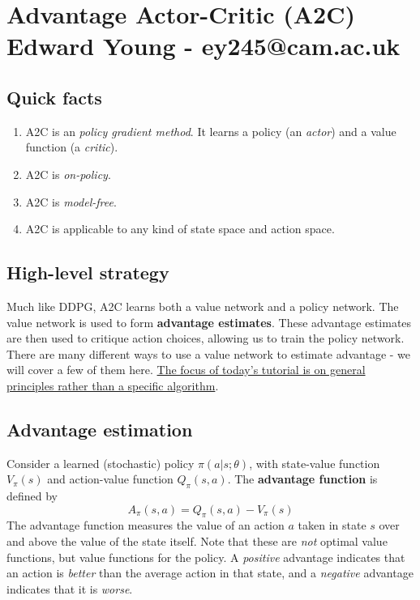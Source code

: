 \documentclass[]{article}
\title{}
\author{Edward Young \\ \large ey245@cam.ac.uk}
\date{}
\begin{document}
\section*{Advantage Actor-Critic (A2C) \\ \small Edward Young - ey245@cam.ac.uk}

\subsection*{Quick facts}
\begin{enumerate}
	\item A2C is an \emph{policy gradient method}. It learns a policy (an \emph{actor}) and a value function (a \emph{critic}).
	\item A2C is \emph{on-policy}.
	\item A2C is \emph{model-free}.
	\item A2C is applicable to any kind of state space and action space.
\end{enumerate}

\subsection*{High-level strategy}
Much like DDPG, A2C learns both a value network and a policy network. The value network is used to form \textbf{advantage estimates}. These advantage estimates are then used to critique action choices, allowing us to train the policy network. There are many different ways to use a value network to estimate advantage - we will cover a few of them here. \ul{The focus of today's tutorial is on general principles rather than a specific algorithm}. 

\subsection*{Advantage estimation}
Consider a learned (stochastic) policy $\pi(a|s;\theta)$, with state-value function $V_\pi(s)$ and action-value function $Q_\pi(s,a)$. The \textbf{advantage function} is defined by 
\begin{equation}
	A_\pi(s,a) = Q_\pi(s,a) - V_\pi(s)
\end{equation}
The advantage function measures the value of an action $a$ taken in state $s$ over and above the value of the state itself. Note that these are \emph{not} optimal value functions, but value functions for the policy. A \emph{positive} advantage indicates that an action is \emph{better} than the average action in that state, and a \emph{negative} advantage indicates that it is \emph{worse}.
\end{document}
